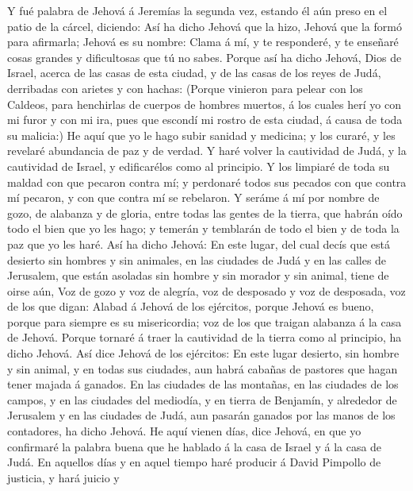  Y fué palabra de Jehová á Jeremías la segunda vez,
estando él aún preso en el patio de la cárcel, diciendo: 
Así ha dicho Jehová que la hizo, Jehová que la formó para afirmarla;
Jehová es su nombre:  Clama á mí, y te responderé, y te
enseñaré cosas grandes y dificultosas que tú no sabes. 
Porque así ha dicho Jehová, Dios de Israel, acerca de las casas de esta
ciudad, y de las casas de los reyes de Judá, derribadas con arietes y
con hachas:  (Porque vinieron para pelear con los Caldeos,
para henchirlas de cuerpos de hombres muertos, á los cuales herí yo con
mi furor y con mi ira, pues que escondí mi rostro de esta ciudad, á
causa de toda su malicia:)  He aquí que yo le hago subir
sanidad y medicina; y los curaré, y les revelaré abundancia de paz y de
verdad.  Y haré volver la cautividad de Judá, y la
cautividad de Israel, y edificarélos como al principio.  Y
los limpiaré de toda su maldad con que pecaron contra mí; y perdonaré
todos sus pecados con que contra mí pecaron, y con que contra mí se
rebelaron.  Y seráme á mí por nombre de gozo, de alabanza
y de gloria, entre todas las gentes de la tierra, que habrán oído todo
el bien que yo les hago; y temerán y temblarán de todo el bien y de toda
la paz que yo les haré.  Así ha dicho Jehová: En este
lugar, del cual decís que está desierto sin hombres y sin animales, en
las ciudades de Judá y en las calles de Jerusalem, que están asoladas
sin hombre y sin morador y sin animal, tiene de oirse aún,
 Voz de gozo y voz de alegría, voz de desposado y voz de
desposada, voz de los que digan: Alabad á Jehová de los ejércitos,
porque Jehová es bueno, porque para siempre es su misericordia; voz de
los que traigan alabanza á la casa de Jehová. Porque tornaré á traer la
cautividad de la tierra como al principio, ha dicho Jehová.
 Así dice Jehová de los ejércitos: En este lugar
desierto, sin hombre y sin animal, y en todas sus ciudades, aun habrá
cabañas de pastores que hagan tener majada á ganados.  En
las ciudades de las montañas, en las ciudades de los campos, y en las
ciudades del mediodía, y en tierra de Benjamín, y alrededor de Jerusalem
y en las ciudades de Judá, aun pasarán ganados por las manos de los
contadores, ha dicho Jehová.  He aquí vienen días, dice
Jehová, en que yo confirmaré la palabra buena que he hablado á la casa
de Israel y á la casa de Judá.  En aquellos días y en
aquel tiempo haré producir á David Pimpollo de justicia, y hará juicio y
